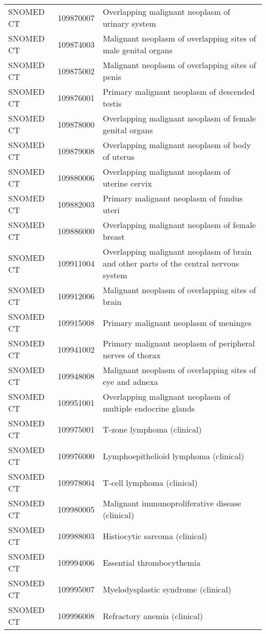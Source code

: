 \begin{longtable}{p{}p{}p{}}
  SNOMED CT & 109870007 & Overlapping malignant neoplasm of urinary system \\ 
  SNOMED CT & 109874003 & Malignant neoplasm of overlapping sites of male genital organs \\ 
  SNOMED CT & 109875002 & Malignant neoplasm of overlapping sites of penis \\ 
  SNOMED CT & 109876001 & Primary malignant neoplasm of descended testis \\ 
  SNOMED CT & 109878000 & Overlapping malignant neoplasm of female genital organs \\ 
  SNOMED CT & 109879008 & Overlapping malignant neoplasm of body of uterus \\ 
  SNOMED CT & 109880006 & Overlapping malignant neoplasm of uterine cervix \\ 
  SNOMED CT & 109882003 & Primary malignant neoplasm of fundus uteri \\ 
  SNOMED CT & 109886000 & Overlapping malignant neoplasm of female breast \\ 
  SNOMED CT & 109911004 & Overlapping malignant neoplasm of brain and other parts of the central nervous system \\ 
  SNOMED CT & 109912006 & Malignant neoplasm of overlapping sites of brain \\ 
  SNOMED CT & 109915008 & Primary malignant neoplasm of meninges \\ 
  SNOMED CT & 109941002 & Primary malignant neoplasm of peripheral nerves of thorax \\ 
  SNOMED CT & 109948008 & Malignant neoplasm of overlapping sites of eye and adnexa \\ 
  SNOMED CT & 109951001 & Overlapping malignant neoplasm of multiple endocrine glands \\ 
  SNOMED CT & 109975001 & T-zone lymphoma (clinical) \\ 
  SNOMED CT & 109976000 & Lymphoepithelioid lymphoma (clinical) \\ 
  SNOMED CT & 109978004 & T-cell lymphoma (clinical) \\ 
  SNOMED CT & 109980005 & Malignant immunoproliferative disease (clinical) \\ 
  SNOMED CT & 109988003 & Histiocytic sarcoma (clinical) \\ 
  SNOMED CT & 109994006 & Essential thrombocythemia \\ 
  SNOMED CT & 109995007 & Myelodysplastic syndrome (clinical) \\ 
  SNOMED CT & 109996008 & Refractory anemia (clinical) \\ 

\end{longtable}
